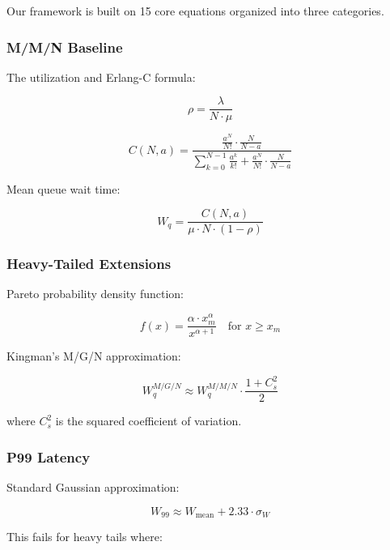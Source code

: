 \documentclass[conference,twocolumn]{IEEEtran}
\begin{document}
Our framework is built on 15 core equations organized into three categories.

\subsubsection{M/M/N Baseline}

The utilization and Erlang-C formula:

\begin{equation}
\rho = \frac{\lambda}{N \cdot \mu}
\end{equation}

\begin{equation}
C(N, a) = \frac{\frac{a^N}{N!} \cdot \frac{N}{N-a}}{\sum_{k=0}^{N-1}\frac{a^k}{k!} + \frac{a^N}{N!} \cdot \frac{N}{N-a}}
\end{equation}

Mean queue wait time:

\begin{equation}
W_q = \frac{C(N, a)}{\mu \cdot N \cdot (1-\rho)}
\end{equation}

\subsubsection{Heavy-Tailed Extensions}

Pareto probability density function:

\begin{equation}
f(x) = \frac{\alpha \cdot x_m^\alpha}{x^{\alpha+1}} \quad \text{for } x \geq x_m
\end{equation}

Kingman's M/G/N approximation:

\begin{equation}
W_q^{M/G/N} \approx W_q^{M/M/N} \cdot \frac{1 + C_s^2}{2}
\end{equation}

where $C_s^2$ is the squared coefficient of variation.

\subsubsection{P99 Latency}

Standard Gaussian approximation:

\begin{equation}
W_{99} \approx W_{\text{mean}} + 2.33 \cdot \sigma_W
\end{equation}

This fails for heavy tails where:
\end{document}
